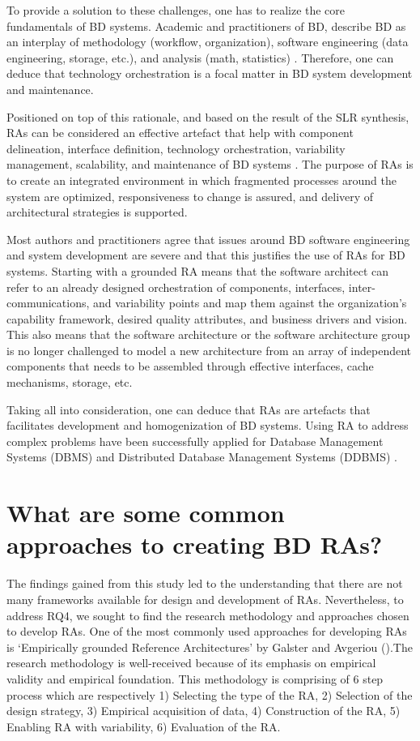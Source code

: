 \documentclass[review]{elsarticle}
\begin{document}
To provide a solution to these challenges, one has to realize the core fundamentals of BD systems. Academic and practitioners of BD, describe BD as an interplay of methodology (workflow, organization), software engineering (data engineering, storage, etc.), and analysis (math, statistics) \cite{akhtar2019big}\cite{AtaeiBigDataEnvirons}. Therefore, one can deduce that technology orchestration is a focal matter in BD system development and maintenance.

Positioned on top of this rationale, and based on the result of the SLR synthesis, RAs can be considered an effective artefact that help with component delineation, interface definition, technology orchestration, variability management, scalability, and maintenance of BD systems \cite{Chang}\cite{Nadal}. The purpose of RAs is to create an integrated environment in which fragmented processes around the system are optimized, responsiveness to change is assured, and delivery of architectural strategies is supported. 

Most authors and practitioners agree that issues around BD software engineering and system development are severe and that this justifies the use of RAs for BD systems. Starting with a grounded RA means that the software architect can refer to an already designed orchestration of components, interfaces, inter-communications, and variability points and map them against the organization’s capability framework, desired quality attributes, and business drivers and vision. This also means that the software architecture or the software architecture group is no longer challenged to model a new architecture from an array of independent components that needs to be assembled through effective interfaces, cache mechanisms, storage, etc. 

Taking all into consideration, one can deduce that RAs are artefacts that facilitates development and homogenization of BD systems. Using RA to address complex problems have been successfully applied for Database Management Systems (DBMS) \cite{pineiro2019big} and Distributed Database Management Systems (DDBMS) \cite{rahimi2010distributed}.

\section{What are some common approaches to creating BD RAs?}

The findings gained from this study led to the understanding that there are not many frameworks available for design and development of RAs. Nevertheless, to address RQ4, we sought to find the research methodology and approaches chosen to develop RAs. One of the most commonly used approaches for developing RAs is ‘Empirically grounded Reference Architectures’ by Galster and Avgeriou (\cite{galster2011empirically}).The research methodology is well-received because of its emphasis on empirical validity and empirical foundation. This methodology is comprising of 6 step process which are respectively 1) Selecting the type of the RA, 2) Selection of the design strategy, 3) Empirical acquisition of data, 4) Construction of the RA, 5) Enabling RA with variability, 6) Evaluation of the RA.
\end{document}
